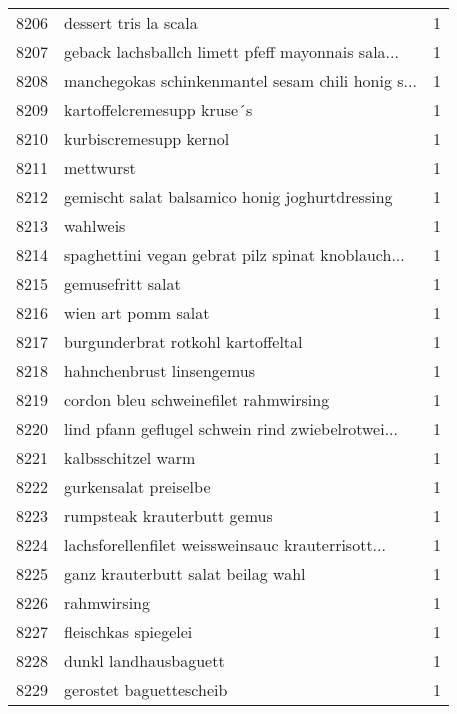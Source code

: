 \begin{tabular}{llr}
8206 &                              dessert tris la scala &      1 \\
8207 &  geback lachsballch limett pfeff mayonnais sala... &      1 \\
8208 &  manchegokas schinkenmantel sesam chili honig s... &      1 \\
8209 &                         kartoffelcremesupp kruse´s &      1 \\
8210 &                             kurbiscremesupp kernol &      1 \\
8211 &                                          mettwurst &      1 \\
8212 &     gemischt salat balsamico honig joghurtdressing &      1 \\
8213 &                                           wahlweis &      1 \\
8214 &  spaghettini vegan gebrat pilz spinat knoblauch... &      1 \\
8215 &                                  gemusefritt salat &      1 \\
8216 &                                wien art pomm salat &      1 \\
8217 &                 burgunderbrat rotkohl kartoffeltal &      1 \\
8218 &                          hahnchenbrust linsengemus &      1 \\
8219 &              cordon bleu schweinefilet rahmwirsing &      1 \\
8220 &  lind pfann geflugel schwein rind zwiebelrotwei... &      1 \\
8221 &                                 kalbsschitzel warm &      1 \\
8222 &                              gurkensalat preiselbe &      1 \\
8223 &                        rumpsteak krauterbutt gemus &      1 \\
8224 &  lachsforellenfilet weissweinsauc krauterrisott... &      1 \\
8225 &                 ganz krauterbutt salat beilag wahl &      1 \\
8226 &                                        rahmwirsing &      1 \\
8227 &                               fleischkas spiegelei &      1 \\
8228 &                              dunkl landhausbaguett &      1 \\
8229 &                            gerostet baguettescheib &      1 \\

\end{tabular}
